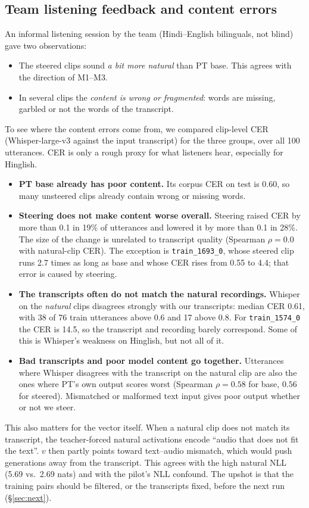 \documentclass[11pt]{article}
\begin{document}
\subsection{Team listening feedback and content errors}\label{sec:listening-feedback}
An informal listening session by the team (Hindi--English bilinguals, not blind) gave two observations:
\begin{itemize}
\item The steered clips sound \emph{a bit more natural} than PT base. This agrees with the direction of M1--M3.
\item In several clips the \emph{content is wrong or fragmented}: words are missing, garbled or not the words of the transcript.
\end{itemize}
To see where the content errors come from, we compared clip-level CER (Whisper-large-v3 against the input transcript) for the three groups, over all 100 utterances. CER is only a rough proxy for what listeners hear, especially for Hinglish.
\begin{itemize}
\item \textbf{PT base already has poor content.} Its corpus CER on test is 0.60, so many unsteered clips already contain wrong or missing words.
\item \textbf{Steering does not make content worse overall.} Steering raised CER by more than 0.1 in 19\% of utterances and lowered it by more than 0.1 in 28\%. The size of the change is unrelated to transcript quality (Spearman $\rho=0.0$ with natural-clip CER). The exception is \texttt{train\_1693\_0}, whose steered clip runs 2.7 times as long as base and whose CER rises from 0.55 to 4.4; that error is caused by steering.
\item \textbf{The transcripts often do not match the natural recordings.} Whisper on the \emph{natural} clips disagrees strongly with our transcripts: median CER 0.61, with 38 of 76 train utterances above 0.6 and 17 above 0.8. For \texttt{train\_1574\_0} the CER is 14.5, so the transcript and recording barely correspond. Some of this is Whisper's weakness on Hinglish, but not all of it.
\item \textbf{Bad transcripts and poor model content go together.} Utterances where Whisper disagrees with the transcript on the natural clip are also the ones where PT's own output scores worst (Spearman $\rho=0.58$ for base, $0.56$ for steered). Mismatched or malformed text input gives poor output whether or not we steer.
\end{itemize}
This also matters for the vector itself. When a natural clip does not match its transcript, the teacher-forced natural activations encode ``audio that does not fit the text''. $v$ then partly points toward text--audio mismatch, which would push generations away from the transcript. This agrees with the high natural NLL (5.69 vs.\ 2.69 nats) and with the pilot's NLL confound. The upshot is that the training pairs should be filtered, or the transcripts fixed, before the next run (\S\ref{sec:next}).
\end{document}
